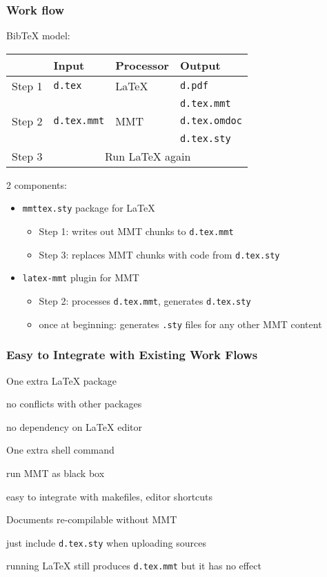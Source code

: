 \begin{frame}\frametitle{Work flow}
BibTeX model:
\begin{center}
\begin{tabular}{|l||l|l|l|}
\hline
& Input & Processor & Output \\
\hline
\hline
Step 1 & \texttt{d.tex} & LaTeX & \texttt{d.pdf} \\
       &                &       & \texttt{d.tex.mmt}\\
\hline
Step 2 & \texttt{d.tex.mmt} & MMT & \texttt{d.tex.omdoc} \\
       &                    &     & \texttt{d.tex.sty}\\
\hline
Step 3 & \multicolumn{3}{c|}{Run LaTeX again} \\
\hline
\end{tabular}
\end{center}

2 components:
\begin{itemize}
\item \texttt{mmttex.sty} package for LaTeX
 \begin{itemize}
 \item Step 1: writes out MMT chunks to \texttt{d.tex.mmt}
 \item Step 3: replaces MMT chunks with code from \texttt{d.tex.sty}
 \end{itemize}
\item \texttt{latex-mmt} plugin for MMT
 \begin{itemize}
 \item Step 2: processes \texttt{d.tex.mmt}, generates \texttt{d.tex.sty}
 \item once at beginning: generates \texttt{.sty} files for any other MMT content
 \end{itemize}
\end{itemize}

\end{frame}

\begin{frame}\frametitle{Easy to Integrate with Existing Work Flows}
 \begin{blockitems}{One extra LaTeX package}
 \item no conflicts with other packages
 \item no dependency on LaTeX editor
 \end{blockitems}

 \begin{blockitems}{One extra shell command}
 \item run MMT as black box
 \item easy to integrate with makefiles, editor shortcuts
 \end{blockitems}

 \begin{blockitems}{Documents re-compilable without MMT}
 \item just include \texttt{d.tex.sty} when uploading sources
 \item running LaTeX still produces \texttt{d.tex.mmt} but it has no effect
 \end{blockitems}

\end{frame}

